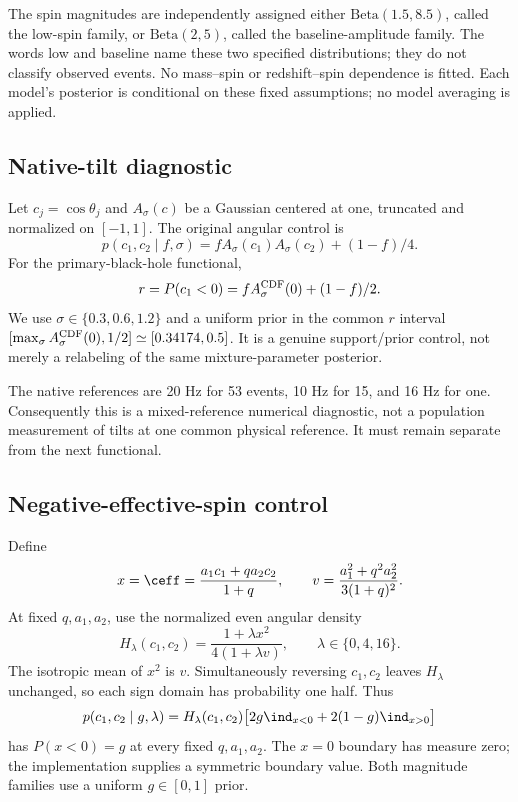 The spin magnitudes are independently assigned either $\mathrm{Beta}(1.5,8.5)$, called the low-spin family, or $\mathrm{Beta}(2,5)$, called the baseline-amplitude family. The words low and baseline name these two specified distributions; they do not classify observed events. No mass--spin or redshift--spin dependence is fitted. Each model's posterior is conditional on these fixed assumptions; no model averaging is applied.

\subsection{Native-tilt diagnostic}
Let $c_j=\cos\theta_j$ and $A_\sigma(c)$ be a Gaussian centered at one, truncated and normalized on $[-1,1]$. The original angular control is
\begin{equation}
 p(c_1,c_2\mid f,\sigma)=f A_\sigma(c_1)A_\sigma(c_2)+(1-f)/4.
\end{equation}
For the primary-black-hole functional,
\begin{equation}
 r=P(c_1<0)=f A_\sigma^{\rm CDF}(0)+(1-f)/2.\label{eq:r}
\end{equation}
We use $\sigma\in\{0.3,0.6,1.2\}$ and a uniform prior in the common $r$ interval $[\max_\sigma A_\sigma^{\rm CDF}(0),1/2]\simeq[0.34174,0.5]$. It is a genuine support/prior control, not merely a relabeling of the same mixture-parameter posterior.

The native references are 20 Hz for 53 events, 10 Hz for 15, and 16 Hz for one. Consequently this is a mixed-reference numerical diagnostic, not a population measurement of tilts at one common physical reference. It must remain separate from the next functional.

\subsection{Negative-effective-spin control}
Define
\begin{equation}
 x=\ceff=\frac{a_1c_1+qa_2c_2}{1+q},\qquad
 v=\frac{a_1^2+q^2a_2^2}{3(1+q)^2}.
\end{equation}
At fixed $q,a_1,a_2$, use the normalized even angular density
\begin{equation}
 H_\lambda(c_1,c_2)=\frac{1+\lambda x^2}{4(1+\lambda v)},\qquad
 \lambda\in\{0,4,16\}.
\end{equation}
The isotropic mean of $x^2$ is $v$. Simultaneously reversing $c_1,c_2$ leaves $H_\lambda$ unchanged, so each sign domain has probability one half. Thus
\begin{equation}
 p(c_1,c_2\mid g,\lambda)=H_\lambda(c_1,c_2)
 \big[2g\ind_{x<0}+2(1-g)\ind_{x>0}\big]\label{eq:gmodel}
\end{equation}
has $P(x<0)=g$ at every fixed $q,a_1,a_2$. The $x=0$ boundary has measure zero; the implementation supplies a symmetric boundary value. Both magnitude families use a uniform $g\in[0,1]$ prior.

